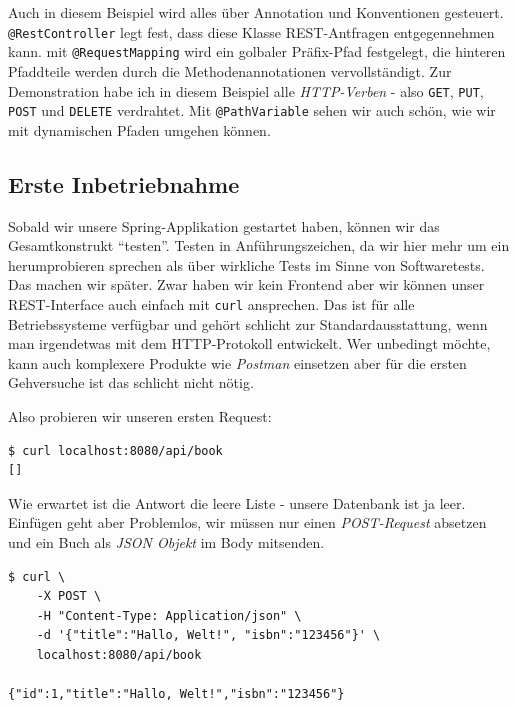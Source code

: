 Auch in diesem Beispiel wird alles über Annotation und Konventionen gesteuert.
\texttt{@RestController} legt fest, dass diese Klasse REST-Antfragen
entgegennehmen kann. mit \texttt{@RequestMapping} wird ein golbaler
Präfix-Pfad festgelegt, die hinteren Pfaddteile werden durch die 
Methodenannotationen vervollständigt. Zur Demonstration habe ich in diesem
Beispiel alle \textit{HTTP-Verben} - also \texttt{GET}, \texttt{PUT},
\texttt{POST} und \texttt{DELETE} verdrahtet. Mit \texttt{@PathVariable}
sehen wir auch schön, wie wir mit dynamischen Pfaden umgehen können.

\subsection{Erste Inbetriebnahme}
Sobald wir unsere Spring-Applikation gestartet haben, können wir das 
Gesamtkonstrukt ``testen''. Testen in Anführungszeichen, da wir hier
mehr um ein herumprobieren sprechen als über wirkliche Tests im Sinne
von Softwaretests. Das machen wir später. Zwar haben wir kein
Frontend aber wir können unser REST-Interface auch einfach mit 
\texttt{curl} ansprechen. Das ist für alle Betriebssysteme verfügbar und
gehört schlicht zur Standardausstattung, wenn man irgendetwas mit dem
HTTP-Protokoll entwickelt. Wer unbedingt möchte, kann auch komplexere
Produkte wie \textit{Postman} einsetzen aber für die ersten Gehversuche
ist das schlicht nicht nötig.

Also probieren wir unseren ersten Request:

\begin{terminalbox}
    \begin{verbatim}
$ curl localhost:8080/api/book 
[]
    \end{verbatim}
\end{terminalbox}

Wie erwartet ist die Antwort die leere Liste - unsere Datenbank ist ja leer.
Einfügen geht aber Problemlos, wir müssen nur einen \textit{POST-Request}
absetzen und ein Buch als \textit{JSON Objekt} im Body mitsenden.

\begin{terminalbox}
    \begin{verbatim}
$ curl \
    -X POST \
    -H "Content-Type: Application/json" \
    -d '{"title":"Hallo, Welt!", "isbn":"123456"}' \
    localhost:8080/api/book

{"id":1,"title":"Hallo, Welt!","isbn":"123456"}
    \end{verbatim}
\end{terminalbox}

